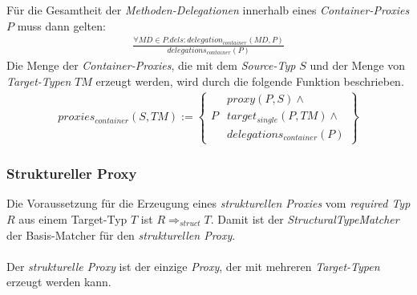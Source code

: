 \noindent
Für die Gesamtheit der \emph{Methoden-Delegationen} innerhalb eines \emph{Container-Proxies} $P$ muss dann gelten:
\begin{gather*}
\frac{\mathit{\forall \mathit{MD} \in P.dels: \mathit{delegation_{container}(MD,P)}}}
{\mathit{delegations_{container}(P)}}
\end{gather*}
\noindent
Die Menge der \emph{Container-Proxies}, die mit dem \emph{Source-Typ} $S$ und der Menge von \emph{Target-Typen} $\mathit{TM}$ erzeugt werden, wird durch die folgende Funktion beschrieben.
\begin{gather*}
\mathit{proxies_{container}(S,\mathit{TM})} := 
\left\{\begin{array}{l|l}
		& \mathit{proxy(P,S)}  \wedge \mathit{ } \\
	P	& \mathit{target_{single}(P,\mathit{TM})} \wedge \mathit{ } \\
		& \mathit{delegations_{container}(P)} 
		 \end{array}
\right\}
\end{gather*}
\subsubsection{Struktureller Proxy}\label{sssec_structproxy}
Die Voraussetzung für die Erzeugung eines \emph{strukturellen Proxies} vom \emph{required Typ} $R$ aus einem Target-Typ $T$ ist $R \Rightarrow_{struct} T$. Damit ist der \emph{StructuralTypeMatcher} der Basis-Matcher für den \emph{strukturellen Proxy}.
\\\\
Der \emph{strukturelle Proxy} ist der einzige \emph{Proxy}, der mit mehreren \emph{Target-Typen} erzeugt werden kann. 
